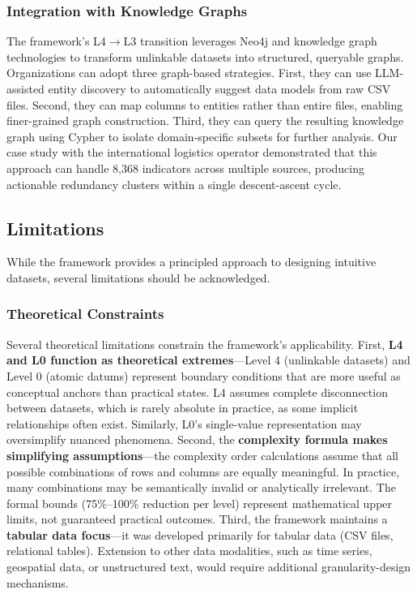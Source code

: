 \documentclass[12pt,a4paper]{article}
\begin{document}
\subsubsection{Integration with Knowledge Graphs}

The framework's L4$\to$L3 transition leverages Neo4j and knowledge graph technologies to transform unlinkable datasets into structured, queryable graphs. Organizations can adopt three graph-based strategies. First, they can use LLM-assisted entity discovery to automatically suggest data models from raw CSV files. Second, they can map columns to entities rather than entire files, enabling finer-grained graph construction. Third, they can query the resulting knowledge graph using Cypher to isolate domain-specific subsets for further analysis. Our case study with the international logistics operator demonstrated that this approach can handle 8,368 indicators across multiple sources, producing actionable redundancy clusters within a single descent-ascent cycle.

\subsection{Limitations}



While the framework provides a principled approach to designing intuitive datasets, several limitations should be acknowledged.

\subsubsection{Theoretical Constraints}

Several theoretical limitations constrain the framework's applicability. First, \textbf{L4 and L0 function as theoretical extremes}---Level 4 (unlinkable datasets) and Level 0 (atomic datums) represent boundary conditions that are more useful as conceptual anchors than practical states. L4 assumes complete disconnection between datasets, which is rarely absolute in practice, as some implicit relationships often exist. Similarly, L0's single-value representation may oversimplify nuanced phenomena. Second, the \textbf{complexity formula makes simplifying assumptions}---the complexity order calculations assume that all possible combinations of rows and columns are equally meaningful. In practice, many combinations may be semantically invalid or analytically irrelevant. The formal bounds (75\%--100\% reduction per level) represent mathematical upper limits, not guaranteed practical outcomes. Third, the framework maintains a \textbf{tabular data focus}---it was developed primarily for tabular data (CSV files, relational tables). Extension to other data modalities, such as time series, geospatial data, or unstructured text, would require additional granularity-design mechanisms.
\end{document}
